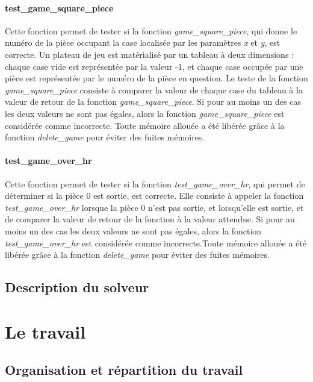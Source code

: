 \documentclass{report}
\begin{document}
\subsection{test\_game\_square\_piece}
Cette fonction permet de tester si la fonction \emph{game\_square\_piece}, qui donne le numéro de la pièce occupant la case localisée par les  paramètres \emph{x} et \emph{y}, est correcte. Un plateau de jeu est matérialisé par un tableau à deux dimensions : chaque case vide est représentée par la valeur -1, et chaque case occupée par une pièce est représentée par le numéro de la pièce en question. Le teste de la fonction \emph{game\_square\_piece} consiste à comparer la valeur de chaque case du tableau à la valeur de retour de la fonction \emph{game\_square\_piece}. Si pour au moins un des cas les deux valeurs ne sont pas égales, alors la fonction \emph{game\_square\_piece} est considérée comme incorrecte. Toute mémoire allouée a été libérée grâce à la fonction \emph{delete\_game} pour éviter des fuites mémoires.
\subsection{test\_game\_over\_hr}
Cette fonction permet de tester si la fonction \emph{test\_game\_over\_hr}, qui permet de déterminer si la pièce 0 est sortie, est correcte. Elle consiste à appeler la fonction \emph{test\_game\_over\_hr} lorsque la pièce 0 n'est pas sortie, et lorsqu'elle est sortie, et de comparer la valeur de retour de la fonction à la valeur attendue. Si pour au moins un des cas les deux valeurs ne sont pas égales, alors la fonction \emph{test\_game\_over\_hr} est considérée comme incorrecte.Toute mémoire allouée a été libérée grâce à la fonction \emph{delete\_game} pour éviter des fuites mémoires.

\chapter{Description du solveur}

\setcounter{chapter}{0}
\part{Le travail}

\chapter{Organisation et répartition du travail}       %
\end{document}
